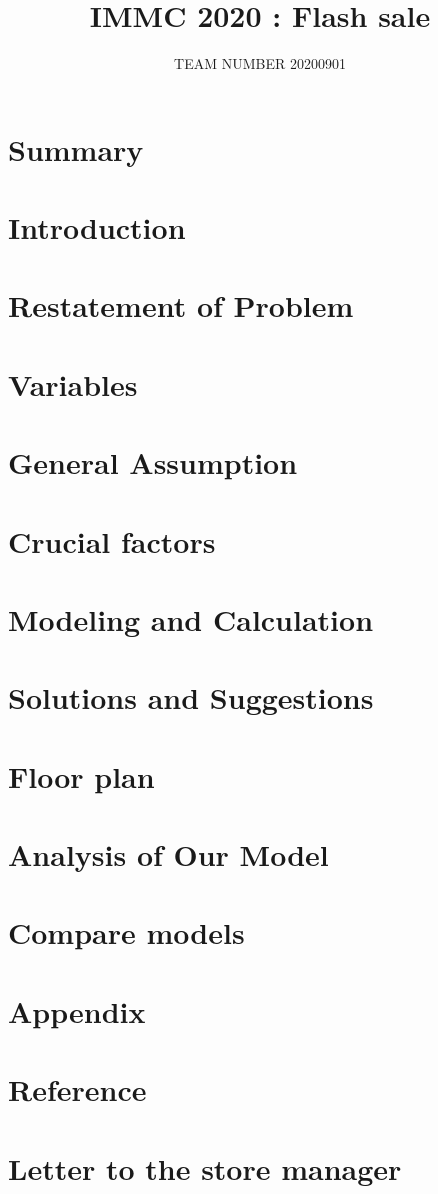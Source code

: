 \documentclass[12pt]{article}
\title{IMMC 2020 : Flash sale}
\date{}
\author{TEAM NUMBER 20200901}
\newcounter{Problem}[section]
\begin{document}
\maketitle

\section{Summary}


\newpage
\tableofcontents
\newpage

\section{Introduction} 


\section{Restatement of Problem}


\section{Variables}


\newpage
\section{General Assumption}

\newpage
\section{Crucial factors}

\newpage
\section{Modeling and Calculation}


\newpage
\section{Solutions and Suggestions}

\newpage
\section{Floor plan}

\newpage
\section{Analysis of Our Model}

\newpage
\section{Compare models}

\newpage
\section{Appendix}

\newpage
\section{Reference}


\newpage
\section{Letter to the store manager}

\end{document}
